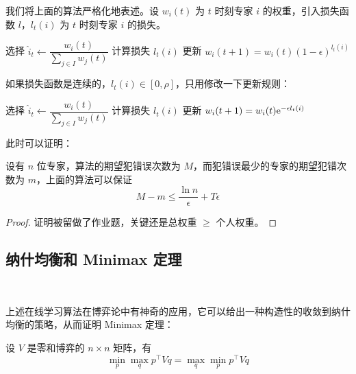 我们将上面的算法严格化地表述。设 $w_i(t)$ 为 $t$ 时刻专家 $i$ 的权重，引入损失函数 $l$，$l_t(i)$ 为 $t$ 时刻专家 $i$ 的损失。

\begin{algorithm}[h]
    \caption{randomized weighted majority 算法（01 损失）}
    \begin{algorithmic}[1]
            \State 选择 $\hat{i}_t \leftarrow \dfrac{w_i(t)}{\sum_{j \in I} w_j(t)}$
                \State 计算损失 $l_t(i)$
                \State 更新 $w_i(t+1) = w_i(t) (1-\epsilon)^{l_t(i)}$
            \EndFor
        \EndFor
    \end{algorithmic}
\end{algorithm}

如果损失函数是连续的，$l_t(i) \in [0, \rho]$，只用修改一下更新规则：

\begin{algorithm}[h]
    \caption{randomized weighted majority 算法（连续损失）}
    \begin{algorithmic}[1]
            \State 选择 $\hat{i}_t \leftarrow \dfrac{w_i(t)}{\sum_{j \in I} w_j(t)}$
                \State 计算损失 $l_t(i)$
                \State 更新 $w_i(t+1) = w_i(t) \mathrm{e}^{-\epsilon l_t(i)}$
            \EndFor
        \EndFor
    \end{algorithmic}
\end{algorithm}

此时可以证明：

\begin{theorem}
    设有 $n$ 位专家，算法的期望犯错误次数为 $M$，而犯错误最少的专家的期望犯错次数为 $m$，上面的算法可以保证
    \[
        M - m \le \frac{\ln n}{\epsilon} + T\epsilon
    \]
\end{theorem}

\begin{proof}
    证明被留做了作业题，关键还是总权重 $\ge$ 个人权重。
\end{proof}

\subsection{纳什均衡和 Minimax 定理} ~

上述在线学习算法在博弈论中有神奇的应用，它可以给出一种构造性的收敛到纳什均衡的策略，从而证明 Minimax 定理：

\begin{theorem}
    设 $V$ 是零和博弈的 $n \times n$ 矩阵，有
    \[
        \min_p \max_q p^\top V q = \max_q \min_p p^\top V q
    \]
\end{theorem}

